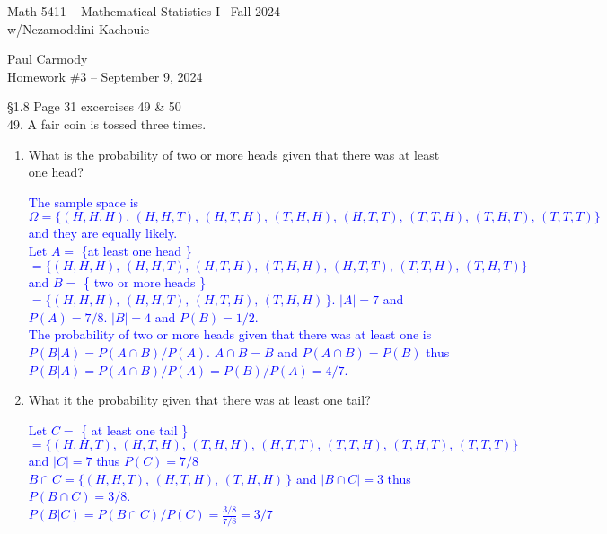 \documentclass[10pt,a4paper]{report}
\newcommand{\CLASSNAME}{Math 5411 -- Mathematical Statistics I}
\newcommand{\PROFESSOR}{Nezamoddini-Kachouie}
\newcommand{\STUDENTNAME}{Paul Carmody}
\newcommand{\ASSIGNMENT}{Homework \#3 }
\newcommand{\DUEDATE}{September 9, 2024}
\newcommand{\SEMESTER}{Fall 2024}
\newcommand{\BLUE}[1]{\textcolor{blue}{#1}}
\begin{document}
\begin{center}
	\Large{\CLASSNAME -- \SEMESTER} \\
	\large{w/\PROFESSOR}
\end{center}
\begin{center}
	\STUDENTNAME \\
	\ASSIGNMENT -- \DUEDATE\\
\end{center}

\S 1.8 Page 31 excercises 49 \& 50\\

49.  A fair coin is tossed three times.
\begin{enumerate}[label=\alph*.]
\item What is the probability of two or more heads given that there was at least one head?

\BLUE{
The sample space is $\Omega = \{ (H,H,H),\,(H,H,T),\,(H,T,H),\,(T,H,H),\,(H,T,T),\,(T,T,H),\,(T,H,T),\,(T,T,T) \}$ and they are equally likely.\\
Let $A = $ \{at least one head \} $= \{ (H,H,H),\,(H,H,T),\,(H,T,H),\,(T,H,H),\,(H,T,T),\,(T,T,H),\,(T,H,T)\}$ and $B = $ \{ two or more heads \} $= \{ (H,H,H),\,(H,H,T),\,(H,T,H),\,(T,H,H)\,\}$.  $|A| = 7$ and $P(A)=7/8$.  $|B| = 4$ and $P(B) = 1/2$.\\
The probability of two or more heads given that there was at least one is $P(B|A) = P(A \cap B)/P(A)$.  $A \cap B = B$ and $P(A \cap B) = P(B)$ thus $P(B|A) = P(A \cap B)/P(A) = P(B)/P(A) = 4/7$.
}

\item What it the probability given that there was at least one tail?  

\BLUE{Let $C = $ \{ at least one tail \} $= \{ (H,H,T),\,(H,T,H),\,(T,H,H),\,(H,T,T),\,(T,T,H),\,(T,H,T),\,(T,T,T) \}$ and $|C| = 7$ thus $P(C) = 7/8$\\
$B \cap C = \{ (H,H,T),\,(H,T,H),\,(T,H,H)\,\}$ and $|B \cap C| = 3$ thus $P(B \cap C) = 3/8$.  \\
$P(B|C) = P(B\cap C)/P(C) = \frac{3/8}{7/8} = 3/7$
}

\end{enumerate}
\end{document}
